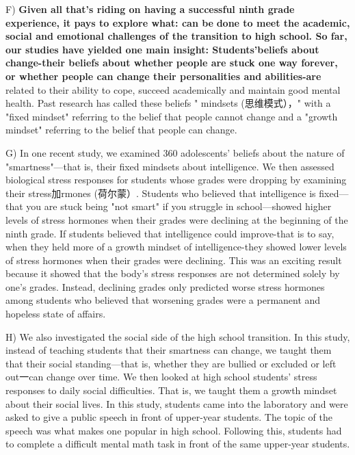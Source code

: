 \documentclass[UTF8,11pt]{ctexart}
\begin{document}
F) \textbf{Given all that's riding on having a successful ninth grade experience, it pays to explore what: can be} \textbf{done to meet the academic, social and emotional challenges of the transition to high school. So far,} \textbf{our studies have yielded one main insight: Students'beliefs about change-their beliefs about whether} \textbf{people are stuck one way forever, or whether people can change their personalities and abilities-are} related to their ability to cope, succeed academically and maintain good mental health. Past research has called these beliefs " mindsets (思维模式），" with a "fixed mindset" referring to the belief that people cannot change and a "growth mindset" referring to the belief that people can change.


G) In one recent study, we examined 360 adolescents' beliefs about the nature of "smartness"—that is, their fixed mindsets about intelligence. We then assessed biological stress responses for students whose grades were dropping by examining their stress加rmones (荷尔蒙）. Students who believed that intelligence is fixed—that you are stuck being "not smart" if you struggle in school—showed higher levels of stress hormones when their grades were declining at the beginning of the ninth grade. If students believed that intelligence could improve-that is to say, when they held more of a growth mindset of intelligence-they showed lower levels of stress hormones when their grades were declining. This was an exciting result because it showed that the body's stress responses are not determined solely by one's grades. Instead, declining grades only predicted worse stress hormones among students who believed that worsening grades were a permanent and hopeless state of affairs.


H) We also investigated the social side of the high school transition. In this study, instead of teaching students that their smartness can change, we taught them that their social standing—that is, whether they are bullied or excluded or left out一can change over time. We then looked at high school students' stress responses to daily social difficulties. That is, we taught them a growth mindset about their social lives. In this study, students came into the laboratory and were asked to give a public speech in front of upper-year students. The topic of the speech was what makes one popular in high school. Following this, students had to complete a difficult mental math task in front of the same upper-year students.
\end{document}
